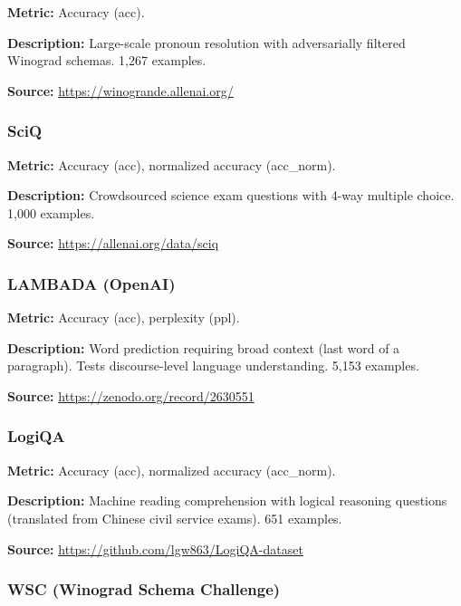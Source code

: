 \documentclass[11pt,a4paper]{article}
\begin{document}
\textbf{Metric:} Accuracy (acc).

\textbf{Description:} Large-scale pronoun resolution with adversarially filtered Winograd schemas. 1,267 examples.

\textbf{Source:} \url{https://winogrande.allenai.org/}

\subsubsection{SciQ}
\label{bench:sciq}

\textbf{Metric:} Accuracy (acc), normalized accuracy (acc\_norm).

\textbf{Description:} Crowdsourced science exam questions with 4-way multiple choice. 1,000 examples.

\textbf{Source:} \url{https://allenai.org/data/sciq}

\subsubsection{LAMBADA (OpenAI)}
\label{bench:lambada}

\textbf{Metric:} Accuracy (acc), perplexity (ppl).

\textbf{Description:} Word prediction requiring broad context (last word of a paragraph). Tests discourse-level language understanding. 5,153 examples.

\textbf{Source:} \url{https://zenodo.org/record/2630551}

\subsubsection{LogiQA}
\label{bench:logiqa}

\textbf{Metric:} Accuracy (acc), normalized accuracy (acc\_norm).

\textbf{Description:} Machine reading comprehension with logical reasoning questions (translated from Chinese civil service exams). 651 examples.

\textbf{Source:} \url{https://github.com/lgw863/LogiQA-dataset}

\subsubsection{WSC (Winograd Schema Challenge)}
\label{bench:wsc}
\end{document}
